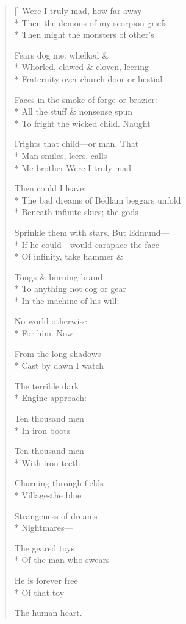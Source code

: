 \label{ch:lear_ap}
\settowidth{\versewidth}{Sprinkle them with stars.   But Edmund---}
\begin{verse}[\versewidth]
 Were I truly mad, how far away\\*
Then the demons of my scorpion griefs---\\*
Then might the monsters of other's

Fears dog me: whelked \&\\*
Whorled, clawed \& cloven, leering\\*
Fraternity over church door or bestial

Faces in the smoke of forge or brazier:\\*
All the stuff \& nonsense spun\\*
To fright the wicked child.   Naught

Frights that child---or man.   That\\*
Man smiles, leers, calls\\*
Me brother.\qquad Were I truly mad

Then could I leave:\\*
The bad dreams of Bedlam beggars unfold\\*
Beneath infinite skies; the gods

Sprinkle them with stars.   But Edmund---\\*
If he could---would carapace the face\\*
Of infinity, take hammer \&

Tongs \& burning brand\\*
To anything not cog or gear\\*
In the machine of his will:

No world otherwise\\*
For him.\hspace*{2\vgap} Now

From the long shadows\\*
Cast by dawn I watch

The terrible dark\\*
Engine approach:

Ten thousand men\\*
In iron boots

Ten thousand men\\*
With iron teeth

Churning through fields\\*
Villages\qquad the blue

Strangeness of dreams\\*
Nightmares---

The geared toys\\*
Of the man who swears

He is forever free\\*
Of that toy

The human heart.
\end{verse}
